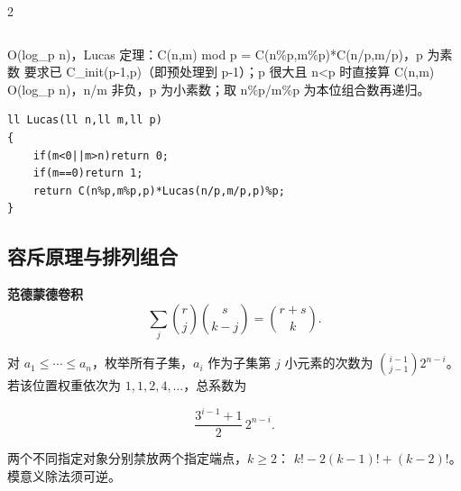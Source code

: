 \documentclass[UTF8,fontset=fandol,a4paper,twoside]{ctexart}
\newcommand{\note}[1]{{\fontsize{10}{12}\selectfont #1\par}}
\begin{document}
\begin{multicols}{2}
\begin{lstlisting}
\end{lstlisting}
\note{O(\allowbreak{}log\_p n)\allowbreak{}，Lucas 定理：C(\allowbreak{}n,\allowbreak{}m)\allowbreak{} mod p =\allowbreak{} C(\allowbreak{}n\%p,\allowbreak{}m\%p)\allowbreak{}*C(\allowbreak{}n/\allowbreak{}p,\allowbreak{}m/\allowbreak{}p)\allowbreak{}，p 为素数 要求已 C\_init(\allowbreak{}p-\allowbreak{}1,\allowbreak{}p)\allowbreak{}（即预处理到 p-\allowbreak{}1）；p 很大且 n<\allowbreak{}p 时直接算 C(\allowbreak{}n,\allowbreak{}m)\allowbreak{} O(\allowbreak{}log\_p n)\allowbreak{}，n/\allowbreak{}m 非负，p 为小素数；取 n\%p/\allowbreak{}m\%p 为本位组合数再递归。}
\begin{lstlisting}
ll Lucas(ll n,ll m,ll p)
{
    if(m<0||m>n)return 0;
    if(m==0)return 1;
    return C(n%p,m%p,p)*Lucas(n/p,m/p,p)%p;
}
\end{lstlisting}
\subsection{容斥原理与排列组合}

\textbf{范德蒙德卷积}
\[
\sum_j\binom rj\binom s{k-j}=\binom{r+s}k.
\]
\note{对 $a_1\le\cdots\le a_n$，枚举所有子集，$a_i$ 作为子集第 $j$ 小元素的次数为
$\binom{i-1}{j-1}2^{n-i}$。若该位置权重依次为 $1,1,2,4,\ldots$，总系数为}
\[
\frac{3^{i-1}+1}{2}\,2^{n-i}.
\]
\note{两个不同指定对象分别禁放两个指定端点，$k\ge2$：
$k!-2(k-1)!+(k-2)!$。模意义除法须可逆。}


\end{multicols}
\end{document}
